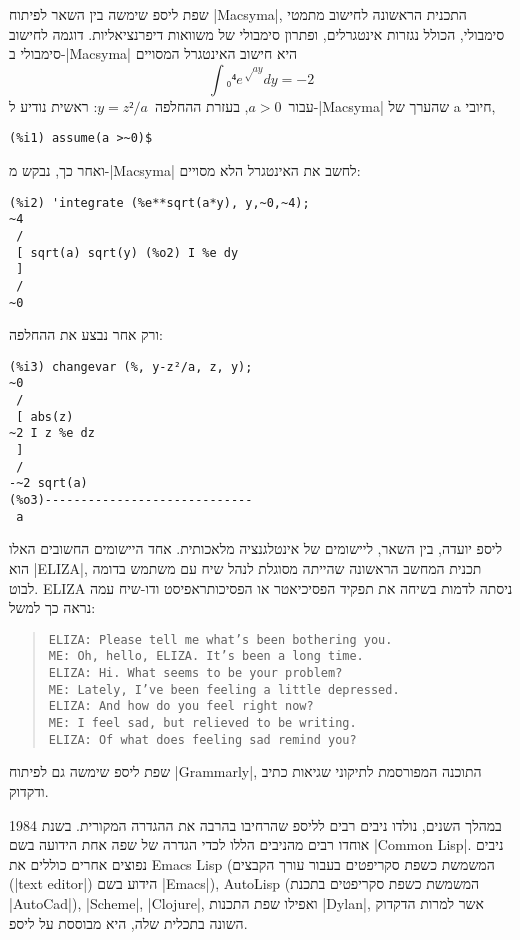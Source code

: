 שפת ליספ שימשה בין השאר לפיתוח \E|Macsyma|, התכנית הראשונה לחישוב מתמטי
סימבולי, הכולל נגזרות אינטגרלים, ופתרון סימבולי של משוואות דיפרנציאליות. דוגמה
לחישוב סימבולי ב-\E|Macsyma| היא חישוב האינטגרל המסויים \[
  ∫₀⁴ e^{√{ay}}dy=-2
\] עבור~$a>0$, בעזרת ההחלפה~$y=z²/a$:
ראשית נודיע ל-\E|Macsyma| שהערך של a חיובי,
\begin{LTR}
\begin{verbatim}
(%i1) assume(a >~0)$
\end{verbatim}
ואחר כך, נבקש מ-\E|Macsyma| לחשב את האינטגרל הלא מסויים:
\begin{verbatim}
(%i2) 'integrate (%e**sqrt(a*y), y,~0,~4);
~4
 /
 [ sqrt(a) sqrt(y) (%o2) I %e dy
 ]
 /
~0
\end{verbatim}
\end{LTR}
ורק אחר נבצע את ההחלפה:
\begin{LTR}
\begin{verbatim}
(%i3) changevar (%, y-z²/a, z, y);
~0
 /
 [ abs(z)
~2 I z %e dz
 ]
 /
-~2 sqrt(a)
(%o3)-----------------------------
 a
\end{verbatim}
\end{LTR}

ליספ יועדה, בין השאר, ליישומים של אינטלגנציה מלאכותית. אחד היישומים החשובים
האלו הוא \E|ELIZA|, תכנית המחשב הראשונה שהייתה מסוגלת לנהל שיח עם משתמש בדומה
לבוט. ELIZA ניסתה לדמות בשיחה את תפקיד הפסיכיאטר או הפסיכותראפיסט ודו-שיח עמה
נראה כך למשל:

\begin{quote}
  \begin{minipage}{0.8\textwidth}
  \begin{LTR}
    \scriptsize
    \begin{verbatim}
ELIZA: Please tell me what’s been bothering you.
ME: Oh, hello, ELIZA. It’s been a long time.
ELIZA: Hi. What seems to be your problem?
ME: Lately, I’ve been feeling a little depressed.
ELIZA: And how do you feel right now?
ME: I feel sad, but relieved to be writing.
ELIZA: Of what does feeling sad remind you?
\end{verbatim}
  \end{LTR}
\end{minipage}
\end{quote}
שפת ליספ שימשה גם לפיתוח \E|Grammarly|, התוכנה המפורסמת לתיקוני שגיאות כתיב
ודקדוק.

במהלך השנים, נולדו ניבים רבים לליספ שהרחיבו בהרבה את ההגדרה המקורית. בשנת 1984
אוחדו רבים מהניבים הללו לכדי הגדרה של שפה אחת הידועה בשם \E|Common Lisp|. ניבים
נפוצים אחרים כוללים את Emacs Lisp (המשמשת כשפת סקריפטים בעבור עורך הקבצים
(\E|text editor|) הידוע בשם \E|Emacs|), AutoLisp (המשמשת כשפת סקריפטים בתכנת
\E|AutoCad|), \E|Scheme|, \E|Clojure|, ואפילו שפת התכנות \E|Dylan|, אשר למרות
הדקדוק השונה בתכלית שלה, היא מבוססת על ליספ.

